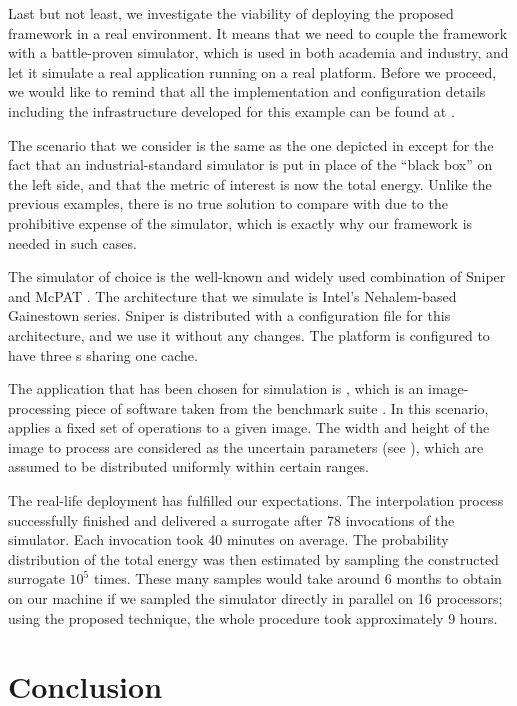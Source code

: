 
Last but not least, we investigate the viability of deploying the proposed
framework in a real environment. It means that we need to couple the framework
with a battle-proven simulator, which is used in both academia and industry, and
let it simulate a real application running on a real platform. Before we
proceed, we would like to remind that all the implementation and configuration
details including the infrastructure developed for this example can be found at
\cite{sources}.

The scenario that we consider is the same as the one depicted in 
except for the fact that an industrial-standard simulator is put in place of the
``black box'' on the left side, and that the metric of interest \g is now the
total energy. Unlike the previous examples, there is no true solution to compare
with due to the prohibitive expense of the simulator, which is exactly why our
framework is needed in such cases.

The simulator of choice is the well-known and widely used combination of Sniper
\cite{carlson2011} and McPAT \cite{li2009}. The architecture that we simulate is
Intel's Nehalem-based Gainestown series. Sniper is distributed with a
configuration file for this architecture, and we use it without any changes. The
platform is configured to have three s sharing one  cache.

The application that has been chosen for simulation is , which is an
image-processing piece of software taken from the  benchmark suite
\cite{bienia2011}. In this scenario,  applies a fixed set of operations
to a given image. The width and height of the image to process are considered as
the uncertain parameters \vu (see ), which are assumed to be
distributed uniformly within certain ranges.

The real-life deployment has fulfilled our expectations. The interpolation
process successfully finished and delivered a surrogate after 78 invocations of
the simulator. Each invocation took 40 minutes on average. The probability
distribution of the total energy was then estimated by sampling the constructed
surrogate $10^5$ times. These many samples would take around 6 months to obtain
on our machine if we sampled the simulator directly in parallel on 16
processors; using the proposed technique, the whole procedure took approximately
9 hours.

\section{Conclusion}

